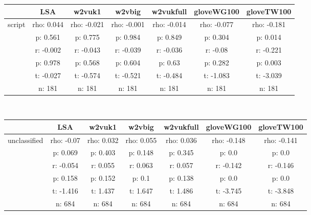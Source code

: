 \documentclass{article}
\begin{document}
\begin{tabular}{ccccccc|}\cline{2-7}
&\multicolumn{1}{|c}{LSA} & w2vuk1 & w2vbig & w2vukfull & gloveWG100 & gloveTW100 \\\hline
\multicolumn{1}{|c|}{\multirow{6}{*}{script}} & rho: 0.044 & rho: -0.021 & rho: -0.001 & rho: -0.014 & rho: -0.077 & rho: -0.181 \\
\multicolumn{1}{|c|}{} & p: 0.561 & p: 0.775 & p: 0.984 & p: 0.849 & p: 0.304 & p: 0.014 \\
\multicolumn{1}{|c|}{} & r: -0.002 & r: -0.043 & r: -0.039 & r: -0.036 & r: -0.08 & r: -0.221 \\
\multicolumn{1}{|c|}{} & p: 0.978 & p: 0.568 & p: 0.604 & p: 0.63 & p: 0.282 & p: 0.003 \\
\multicolumn{1}{|c|}{} & t: -0.027 & t: -0.574 & t: -0.521 & t: -0.484 & t: -1.083 & t: -3.039 \\
\multicolumn{1}{|c|}{} & n: 181 & n: 181 & n: 181 & n: 181 & n: 181 & n: 181 \\
\hline
\end{tabular}\\
\begin{tabular}{ccccccc|}\cline{2-7}
&\multicolumn{1}{|c}{LSA} & w2vuk1 & w2vbig & w2vukfull & gloveWG100 & gloveTW100 \\\hline
\multicolumn{1}{|c|}{\multirow{6}{*}{unclassified}} & rho: -0.07 & rho: 0.032 & rho: 0.055 & rho: 0.036 & rho: -0.148 & rho: -0.141 \\
\multicolumn{1}{|c|}{} & p: 0.069 & p: 0.403 & p: 0.148 & p: 0.345 & p: 0.0 & p: 0.0 \\
\multicolumn{1}{|c|}{} & r: -0.054 & r: 0.055 & r: 0.063 & r: 0.057 & r: -0.142 & r: -0.146 \\
\multicolumn{1}{|c|}{} & p: 0.158 & p: 0.152 & p: 0.1 & p: 0.138 & p: 0.0 & p: 0.0 \\
\multicolumn{1}{|c|}{} & t: -1.416 & t: 1.437 & t: 1.647 & t: 1.486 & t: -3.745 & t: -3.848 \\
\multicolumn{1}{|c|}{} & n: 684 & n: 684 & n: 684 & n: 684 & n: 684 & n: 684 \\
\hline
\end{tabular}\\
\end{document}

